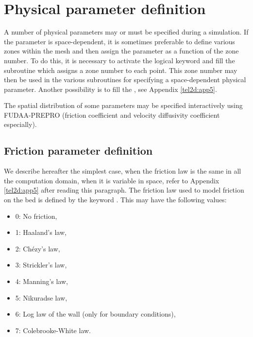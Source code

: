 \chapter{Physical parameter definition}
\label{ch:phys:param:def}
A number of physical parameters may or must be specified during a simulation.
If the parameter is space-dependent, it is sometimes preferable to define
various zones within the mesh and then assign the parameter as a function of the
zone number.
To do this, it is necessary to activate the logical keyword
 and fill the  subroutine
which assigns a zone number to each point.
This zone number may then be used in the various subroutines for specifying
a space-dependent physical parameter.
Another possibility is to fill the , see Appendix
\ref{tel2d:app5}.

The spatial distribution of some parameters may be specified interactively
using FUDAA-PREPRO (friction coefficient and velocity diffusivity coefficient
especially).


\section{Friction parameter definition}
\label{sec:frict:param}
We describe hereafter the simplest case, when the friction law is the same
in all the computation domain, when it is variable in space, refer to Appendix
\ref{tel2d:app5} after reading this paragraph.
The friction law used to model friction on the bed is defined by the keyword
.
This may have the following values:

\begin{itemize}
\item 0: No friction,

\item 1: Haaland's law,

\item 2: Ch\'{e}zy's law,

\item 3: Strickler's law,

\item 4: Manning's law,

\item 5: Nikuradse law,

\item 6: Log law of the wall (only for boundary conditions),

\item 7: Colebrooke-White law.
\end{itemize}

